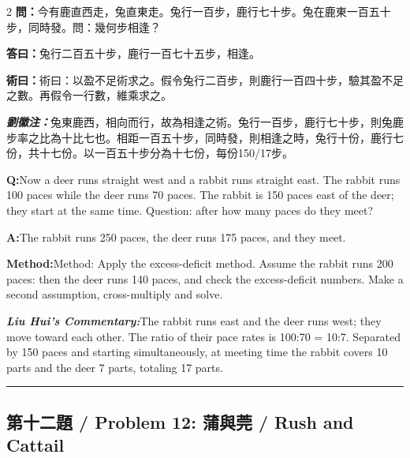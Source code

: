 \documentclass[11pt,a4paper]{article}
\newcommand{\cnwen}{\textcolor{cnlabelfg}{\textbf{問：}}}
\newcommand{\cnda}{\textbf{答曰：}}
\newcommand{\cnshu}{\textcolor{cnlabelfg}{\textbf{術曰：}}}
\newcommand{\cnzhu}{\textcolor{commentarycolor}{\textit{\textbf{劉徽注：}}}}
\newcommand{\enwen}{\textcolor{enlabelfg}{\textbf{Q:}}}
\newcommand{\enda}{\textcolor{enlabelfg}{\textbf{A:}}}
\newcommand{\enshu}{\textcolor{enlabelfg}{\textbf{Method:}}}
\newcommand{\enzhu}{\textcolor{enlabelfg}{\textit{\textbf{Liu Hui's Commentary:}}}}
\begin{document}
\begin{paracol}{2}
\switchcolumn[0]
\cnwen 今有鹿直西走，兔直東走。兔行一百步，鹿行七十步。兔在鹿東一百五十步，同時發。問：幾何步相逢？

\cnda 兔行二百五十步，鹿行一百七十五步，相逢。

\cnshu 術曰：以盈不足術求之。假令兔行二百步，則鹿行一百四十步，驗其盈不足之數。再假令一行數，維乘求之。

\cnzhu 兔東鹿西，相向而行，故為相逢之術。兔行一百步，鹿行七十步，則兔鹿步率之比為十比七也。相距一百五十步，同時發，則相逢之時，兔行十份，鹿行七份，共十七份。以一百五十步分為十七份，每份150/17步。

\switchcolumn[1]
\enwen Now a deer runs straight west and a rabbit runs straight east. The rabbit runs 100 paces while the deer runs 70 paces. The rabbit is 150 paces east of the deer; they start at the same time. Question: after how many paces do they meet?

\enda The rabbit runs 250 paces, the deer runs 175 paces, and they meet.

\enshu Method: Apply the excess-deficit method. Assume the rabbit runs 200 paces: then the deer runs 140 paces, and check the excess-deficit numbers. Make a second assumption, cross-multiply and solve.

\enzhu The rabbit runs east and the deer runs west; they move toward each other. The ratio of their pace rates is 100:70 = 10:7. Separated by 150 paces and starting simultaneously, at meeting time the rabbit covers 10 parts and the deer 7 parts, totaling 17 parts.
\end{paracol}

\bigskip\hrule\bigskip

\subsection{第十二題 / Problem 12: 蒲與莞 / Rush and Cattail}
\end{document}
